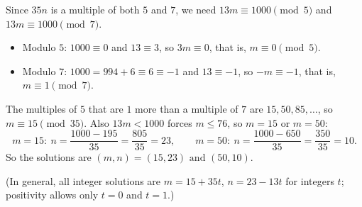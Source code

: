 Since $35n$ is a multiple of both $5$ and $7$, we need $13m\equiv1000\pmod 5$ and $13m\equiv1000\pmod 7$.
\begin{itemize}
\item Modulo $5$: $1000\equiv0$ and $13\equiv3$, so $3m\equiv0$, that is, $m\equiv0\pmod5$.
\item Modulo $7$: $1000=994+6\equiv6\equiv-1$ and $13\equiv-1$, so $-m\equiv-1$, that is, $m\equiv1\pmod7$.
\end{itemize}
The multiples of $5$ that are $1$ more than a multiple of $7$ are $15,50,85,\dots$, so $m\equiv15\pmod{35}$. Also $13m<1000$ forces $m\le76$, so $m=15$ or $m=50$:
\[m=15:\ n=\dfrac{1000-195}{35}=\dfrac{805}{35}=23,\qquad m=50:\ n=\dfrac{1000-650}{35}=\dfrac{350}{35}=10.\]
So the solutions are $\boxed{(m,n)=(15,23)\text{ and }(50,10)}$.

(In general, all integer solutions are $m=15+35t$, $n=23-13t$ for integers $t$; positivity allows only $t=0$ and $t=1$.)

